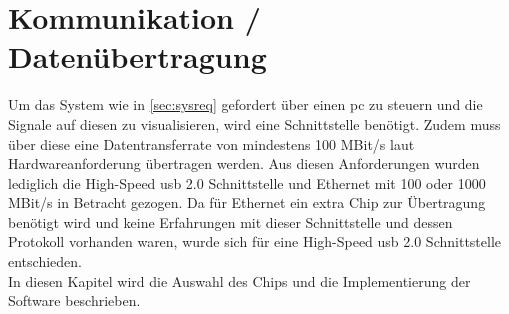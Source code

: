 \section{Kommunikation / Datenübertragung}
Um das System wie in \autoref{sec:sysreq} gefordert über einen \ac{pc} zu steuern und die Signale auf diesen zu visualisieren, wird eine Schnittstelle benötigt. Zudem muss über diese eine Datentransferrate von mindestens 100 MBit/s laut Hardwareanforderung übertragen werden. Aus diesen Anforderungen wurden lediglich die High-Speed \ac{usb} 2.0 Schnittstelle und Ethernet mit 100 oder 1000 MBit/s in Betracht gezogen. Da für Ethernet ein extra Chip zur Übertragung benötigt wird und keine Erfahrungen mit dieser Schnittstelle und dessen Protokoll vorhanden waren, wurde sich für eine High-Speed \ac{usb} 2.0 Schnittstelle entschieden.\\
In diesen Kapitel wird die Auswahl des Chips und die Implementierung der Software beschrieben.
